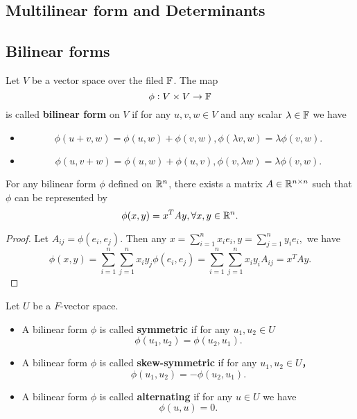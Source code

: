 \begin{refsection}
\section{Multilinear form and Determinants}
\subsection{Bilinear forms}
\begin{definition}
	Let $V$ be a vector space over the filed $\mathbb{F}$. The map $$\phi: V\times V  \to \mathbb{F}$$
	is called \textbf{bilinear form} on $V$ if for any $u,v,w\in V$ and any scalar $\lambda\in \mathbb{F}$ we have
	\begin{itemize}
		\item $$\phi(u+v,w) = \phi(u,w) + \phi(v,w), \phi(\lambda v,w) = \lambda \phi(v,w).$$
		\item $$\phi(u,v+w) = \phi(u,w) + \phi(u,v), \phi(v,\lambda w) = \lambda \phi(v,w).$$
	\end{itemize}	
\end{definition}


\begin{lemma}
	For any bilinear form $\phi$ defined on $\mathbb{R}^n$, there exists a matrix $A\in\mathbb{R}^{n\times n}$ such that $\phi$ can be represented by 
	$$\phi(x,y) = x^TAy, \forall x,y\in \mathbb{R}^n.$$	
\end{lemma}
\begin{proof}
	Let $A_{ij} = \phi(e_i,e_j)$. Then any $x = \sum_{i=1}^n x_ie_i, y=\sum_{j=1}^n y_ie_i,$ we have
	$$\phi(x,y) = \sum_{i=1}^n\sum_{j=1}^n x_iy_j \phi(e_i,e_j) = \sum_{i=1}^n\sum_{j=1}^n x_iy_iA_{ij} = x^TAy.$$
\end{proof}




\begin{definition}
	Let $U$ be a $F$-vector space.
	\begin{itemize}
		\item A bilinear form $\phi$ is called \textbf{symmetric} if for any $u_1,u_2\in U$ 
		$$\phi(u_1,u_2) = \phi(u_2,u_1).$$
		\item A bilinear form $\phi$ is called \textbf{skew-symmetric} if for any $u_1,u_2\in U$，
		$$\phi(u_1,u_2) = -\phi(u_2,u_1).$$
		\item A bilinear form $\phi$ is called \textbf{alternating} if for any $u \in U$ we have
		$$\phi(u,u) = 0.$$	
	\end{itemize}	
\end{definition}





\end{refsection}
